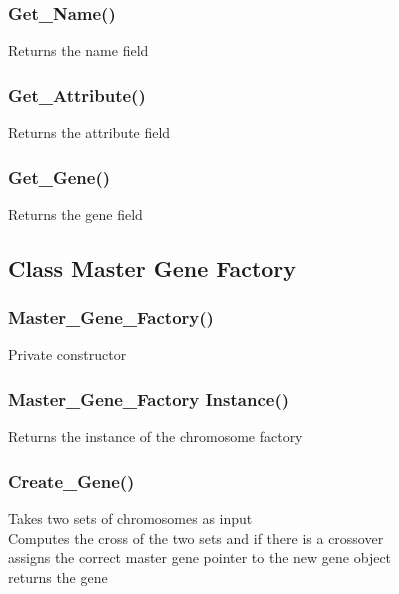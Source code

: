 \documentclass{article}
\begin{document}
\subsubsection{Get\_Name()}
\indent Returns the name field

\subsubsection{Get\_Attribute()}
\indent Returns the attribute field

\subsubsection{Get\_Gene()}
\indent Returns the gene field

\newpage
\subsection{Class Master Gene Factory}

\subsubsection{Master\_Gene\_Factory()}
\indent Private constructor

\subsubsection{Master\_Gene\_Factory Instance()}
\indent Returns the instance of the chromosome factory

\subsubsection{Create\_Gene()}
\indent Takes two sets of chromosomes as input\\
\indent Computes the cross of the two sets and if there is a crossover\\
\indent assigns the correct master gene pointer to the new gene object\\
\indent returns the gene\\


\newpage


\end{document}
